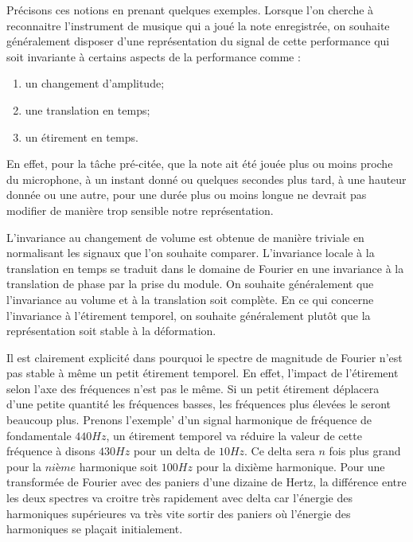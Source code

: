 Précisons ces notions en prenant quelques exemples. Lorsque l'on cherche à reconnaitre l'instrument de musique qui a joué la note enregistrée, on souhaite généralement disposer d'une représentation du signal de cette performance qui soit invariante à certains aspects de la performance comme :
\begin{enumerate}
  \item un changement d'amplitude;
  \item une translation en temps;
  \item un étirement en temps.
\end{enumerate}
En effet, pour la tâche pré-citée, que la note ait été jouée plus ou moins proche du microphone, à un instant donné ou quelques secondes plus tard, à une hauteur donnée ou une autre, pour une durée plus ou moins longue ne devrait pas modifier de manière trop sensible notre représentation.

L'invariance au changement de volume est obtenue de manière triviale en normalisant les signaux que l'on souhaite comparer. L'invariance locale à la translation en temps se traduit dans le domaine de Fourier en une invariance à la translation de phase par la prise du module. On souhaite généralement que l'invariance au volume et à la translation soit complète. En ce qui concerne l'invariance à l'étirement temporel, on souhaite généralement plutôt que la représentation soit stable à la déformation.

Il est clairement explicité dans\cite{anden2014deep} pourquoi le spectre de magnitude de Fourier n'est pas stable à même un petit étirement temporel. En effet, l'impact de l'étirement selon l'axe des fréquences n'est pas le même. Si un petit étirement déplacera d'une petite quantité les fréquences basses, les fréquences plus élevées le seront beaucoup plus. Prenons l'exemple' d'un signal harmonique de fréquence de fondamentale $440 Hz$, un étirement temporel va réduire la valeur de cette fréquence à disons $430 Hz$ pour un delta de $10 Hz$. Ce delta sera $n$ fois plus grand pour la $nième$ harmonique soit $100 Hz$ pour la dixième harmonique. Pour une transformée de Fourier avec des paniers d'une dizaine de Hertz, la différence entre les deux spectres va croitre très rapidement avec delta car l'énergie des harmoniques supérieures va très vite sortir des paniers où l'énergie des harmoniques se plaçait initialement.

